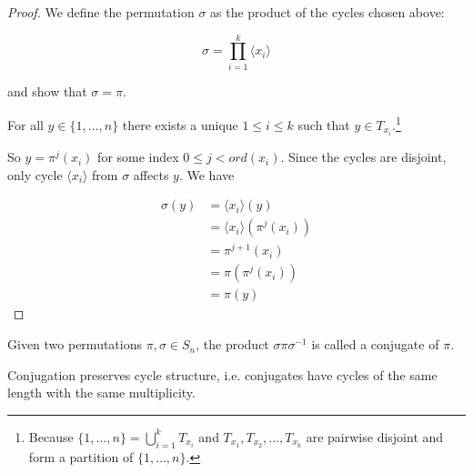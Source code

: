 \begin{proof}
We define the permutation $\sigma$ as the product of the cycles chosen above:

$$
\sigma=\prod\limits^k_{i=1} \langle x_i \rangle
$$

and show that $\sigma=\pi$. 

For all $y \in \{1, \ldots, n\}$ there exists a unique $1 \leq i \leq k$ such that $y \in T_{x_i}$.\footnote{Because $\{1, \ldots, n\} = \bigcup^{k}_{i=1} T_{x_i}$ and $T_{x_1}, T_{x_2}, \ldots, T_{x_k}$ are pairwise disjoint and form a partition of $\{1, \ldots, n\}$.}

So $y = \pi^j(x_i)$ for some index $0 \leq j < ord(x_i)$. Since the cycles are disjoint, only cycle $\langle x_i \rangle$ from $\sigma$ affects $y$. We have

\begin{align*}
\sigma(y) &= \langle x_i \rangle (y) \\
        &= \langle x_i \rangle (\pi^j(x_i)) \\
        &= \pi^{j+1}(x_i) \\
        &= \pi(\pi^j(x_i)) \\
        &= \pi(y)
\end{align*}

\end{proof}

Given two permutations $\pi, \sigma \in S_n$, the product $\sigma \pi \sigma^{-1}$ is called a conjugate of $\pi$.

\begin{thm}\label{conjugationPreservesCycles}
Conjugation preserves cycle structure, i.e. conjugates have cycles of the same length with the same multiplicity.
\end{thm}


